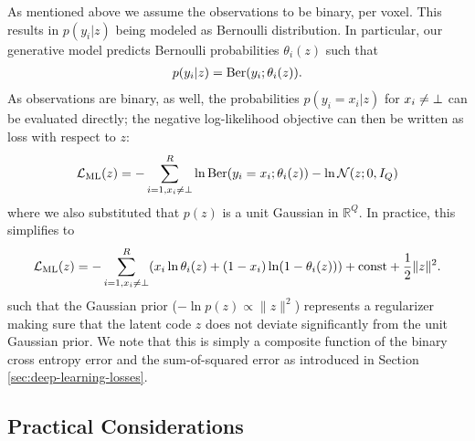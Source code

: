 As mentioned above we assume the observations to be binary, per
voxel. This results in $p(y_i | z)$ being modeled as Bernoulli
distribution. In particular, our generative model predicts
Bernoulli probabilities $\theta_i(z)$ such that
\begin{align}
  p(y_i | z) = \mathrm{Ber}(y_i; \theta_i(z)).
\end{align}
As observations are binary, as well, the probabilities
$p(y_i = x_i | z)$ for $x_i \neq \bot$ can be evaluated directly;
the negative log-likelihood objective can then be written as
loss with respect to $z$:
\begin{align}
  \mathcal{L}_{\text{ML}}(z)
  = - \sum_{i = 1, x_i \neq \bot}^R \ln \mathrm{Ber}(y_i = x_i; \theta_i(z)) - \ln \mathcal{N}(z;0, I_Q)
  \label{eq:shape-inference-ml-loss}
\end{align}
where we also substituted that $p(z)$ is a unit Gaussian in $\mathbb{R}^Q$.
In practice, this simplifies to
\begin{align}
  \mathcal{L}_{\text{ML}}(z)
  = - \sum_{i = 1, x_i \neq \bot}^R (x_i \ln \theta_i(z) + (1 - x_i) \ln (1 - \theta_i(z)))
  + \mathrm{const} + \frac{1}{2}\|z\|^2.
\end{align}
such that the Gaussian prior (\ie $- \ln p(z) \propto \|z\|^2$) represents a
regularizer making sure that the latent code $z$ does not deviate significantly
from the unit Gaussian prior.
We note that this is simply a composite function of the binary cross entropy
error and the sum-of-squared error as introduced in Section \ref{sec:deep-learning-losses}.

\subsection{Practical Considerations}
\label{sec:shape-inference-ml-practical}

